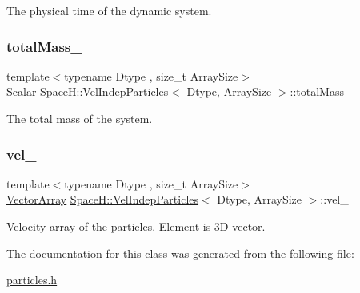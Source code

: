 The physical time of the dynamic system. 

\mbox{\label{class_space_h_1_1_vel_indep_particles_a5daf8df30b36ca633e0ef54933141524}} 
\subsubsection{\texorpdfstring{total\+Mass\+\_\+}{totalMass\_}}
{\footnotesize\ttfamily template$<$typename Dtype , size\+\_\+t Array\+Size$>$ \\
\mbox{\hyperlink{class_space_h_1_1_vel_indep_particles_aeb47d8131b30ed790320ff634f0d6af1}{Scalar}} \mbox{\hyperlink{class_space_h_1_1_vel_indep_particles}{Space\+H\+::\+Vel\+Indep\+Particles}}$<$ Dtype, Array\+Size $>$\+::total\+Mass\+\_\+\hspace{0.3cm}{\ttfamily [protected]}}



The total mass of the system. 

\mbox{\label{class_space_h_1_1_vel_indep_particles_a622d4b5407fb9612516f5c2da0a87f09}} 
\subsubsection{\texorpdfstring{vel\+\_\+}{vel\_}}
{\footnotesize\ttfamily template$<$typename Dtype , size\+\_\+t Array\+Size$>$ \\
\mbox{\hyperlink{class_space_h_1_1_vel_indep_particles_aa9983058940249df8b00fa800e8cbad2}{Vector\+Array}} \mbox{\hyperlink{class_space_h_1_1_vel_indep_particles}{Space\+H\+::\+Vel\+Indep\+Particles}}$<$ Dtype, Array\+Size $>$\+::vel\+\_\+\hspace{0.3cm}{\ttfamily [protected]}}



Velocity array of the particles. Element is 3D vector. 



The documentation for this class was generated from the following file\+:\begin{DoxyCompactItemize}
\item 
\mbox{\hyperlink{particles_8h}{particles.\+h}}\end{DoxyCompactItemize}
